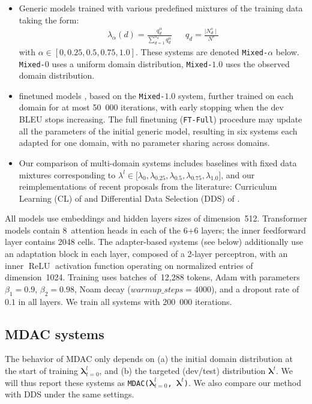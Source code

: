 \documentclass[11pt]{article}
\newcommand{\fyTodo}[1]{\Todo[FY:]{\textcolor{orange}{#1}}}
\newcommand{\system}[1]{\texttt{{#1}}}
\newcommand{\vlambda}{\ensuremath{\boldsymbol\lambda}\xspace} %
\begin{document}
\begin{itemize}
\itemsep0em 
\item Generic models trained with various predefined mixtures of the training data taking the form:
\begin{align} \label{mixture:trn}
\lambda_{\alpha}(d) = \frac{q_d^{\alpha}}{\displaystyle{\mathop{\sum}_{d=1}^{n_d}q_d^{\alpha}}} &&
q_d = \frac{\mid N^{s}_d \mid}{\displaystyle{N^{s}}} %
\end{align} \setlength{\abovedisplayskip}{2pt}
\setlength{\belowdisplayskip}{2pt} 
with $\alpha \in [0,0.25,0.5,0.75,1.0]$. These systems are denoted \system{Mixed-$\alpha$} below. \system{Mixed-$0$} uses a uniform domain distribution, \system{Mixed-$1.0$} uses the observed domain distribution.
\item finetuned models \citep{Luong15stanford,Freitag16fast}, based on the \system{Mixed-$1.0$} system, further trained on each domain for at most 50~000 iterations, with early stopping when the dev BLEU stops increasing.\fyTodo{for ?? iterations} The full finetuning (\system{FT-Full}) procedure may update all the parameters of the initial generic model, resulting in six systems each adapted for one domain, with no parameter sharing across domains.
 
\item Our comparison of multi-domain systems\fyTodo{CL is only dynamic ?} includes baselines with fixed data mixtures corresponding to $\lambda^l \in \big[ \lambda_0, \lambda_{0.25}, \lambda_{0.5}, \lambda_{0.75}, \lambda_{1.0}\big]$, and our reimplementations of recent proposals from the literature: Curriculum Learning (CL) of \citet{Zhang19curriculum} and Differential Data Selection (DDS) of \citet{Wang20balancing}.
\end{itemize}

All models use embeddings and hidden layers sizes of dimension~512. Transformer models contain 8~attention heads in each of the 6+6 layers; the inner feedforward layer contains 2048 cells. The adapter-based systems (see below) additionally use an adaptation block in each layer, composed of a 2-layer perceptron, with an inner $\operatorname{ReLU}$ activation function operating on normalized entries of dimension~1024. 
Training uses batches of~12,288 tokens, Adam with parameters $\beta_1=0.9$, $\beta_2= 0.98$, Noam decay ($warmup\_steps=4000$), and a dropout rate of $0.1$ in all layers. We train all systems with 200~000 iterations.

\subsection{MDAC systems} \label{ssec:dds-sys}
The behavior of MDAC only depends on (a) the initial domain distribution at the start of training $\vlambda^{l}_{t=0}$, and (b) the targeted (dev/test) distribution $\vlambda^{t}$. We will thus report these systems as \system{MDAC($\vlambda^{l}_{t=0}$, $\vlambda^{t}$)}. We also compare our method with DDS under the same settings.
\end{document}

